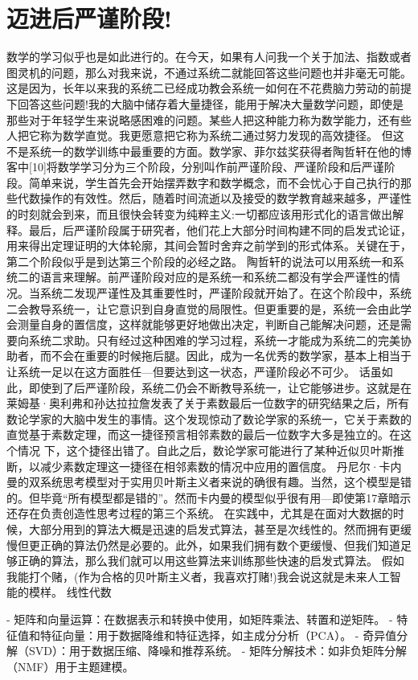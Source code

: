 \section{迈进后严谨阶段!}
数学的学习似乎也是如此进行的。在今天，如果有人问我一个关于加法、指数或者图灵机的问题，那么对我来说，不通过系统二就能回答这些问题也并非毫无可能。这是因为，长年以来我的系统二已经成功教会系统一如何在不花费脑力劳动的前提下回答这些问题!我的大脑中储存着大量捷径，能用于解决大量数学问题，即使是那些对于年轻学生来说略感困难的问题。某些人把这种能力称为数学能力，还有些人把它称为数学直觉。我更愿意把它称为系统二通过努力发现的高效捷径。
但这不是系统一的数学训练中最重要的方面。数学家、菲尔兹奖获得者陶哲轩在他的博客中[10]将数学学习分为三个阶段，分别叫作前严谨阶段、严谨阶段和后严谨阶段。简单来说，学生首先会开始摆弄数字和数学概念，而不会忧心于自己执行的那些代数操作的有效性。然后，随着时间流逝以及接受的数学教育越来越多，严谨性的时刻就会到来，而且很快会转变为纯粹主义:一切都应该用形式化的语言做出解释。最后，后严谨阶段属于研究者，他们花上大部分时间构建不同的启发式论证，用来得出定理证明的大体轮廓，其间会暂时舍弃之前学到的形式体系。关键在于，第二个阶段似乎是到达第三个阶段的必经之路。
陶哲轩的说法可以用系统一和系统二的语言来理解。前严谨阶段对应的是系统一和系统二都没有学会严谨性的情况。当系统二发现严谨性及其重要性时，严谨阶段就开始了。在这个阶段中，系统二会教导系统一，让它意识到自身直觉的局限性。但更重要的是，系统一会由此学会测量自身的置信度，这样就能够更好地做出决定，判断自己能解决问题，还是需要向系统二求助。只有经过这种困难的学习过程，系统一才能成为系统二的完美协助者，而不会在重要的时候拖后腿。因此，成为一名优秀的数学家，基本上相当于让系统一足以在这方面胜任---但要达到这一状态，严谨阶段必不可少。
话虽如此，即使到了后严谨阶段，系统二仍会不断教导系统一，让它能够进步。这就是在莱姆基·奥利弗和孙达拉拉詹发表了关于素数最后一位数字的研究结果之后，所有数论学家的大脑中发生的事情。这个发现惊动了数论学家的系统一，它关于素数的直觉基于素数定理，而这一捷径预言相邻素数的最后一位数字大多是独立的。在这个情况
下，这个捷径出错了。自此之后，数论学家可能进行了某种近似贝叶斯推断，以减少素数定理这一捷径在相邻素数的情况中应用的置信度。
丹尼尔·卡内曼的双系统思考模型对于实用贝叶斯主义者来说的确很有趣。当然，这个模型是错的。但毕竟“所有模型都是错的”。然而卡内曼的模型似乎很有用---即使第17章暗示还存在负责创造性思考过程的第三个系统。
在实践中，尤其是在面对大数据的时候，大部分用到的算法大概是迅速的启发式算法，甚至是次线性的。然而拥有更缓慢但更正确的算法仍然是必要的。此外，如果我们拥有数个更缓慢、但我们知道足够正确的算法，那么我们就可以用这些算法来训练那些快速的启发式算法。
假如我能打个赌，(作为合格的贝叶斯主义者，我喜欢打赌!)我会说这就是未来人工智能的模样。
线性代数

- 矩阵和向量运算：在数据表示和转换中使用，如矩阵乘法、转置和逆矩阵。
- 特征值和特征向量：用于数据降维和特征选择，如主成分分析（PCA）。
- 奇异值分解（SVD）：用于数据压缩、降噪和推荐系统。
- 矩阵分解技术：如非负矩阵分解（NMF）用于主题建模。

\nocite{*}
\printbibliography[heading=bibintoc, title=\ebibname]

\newpage
